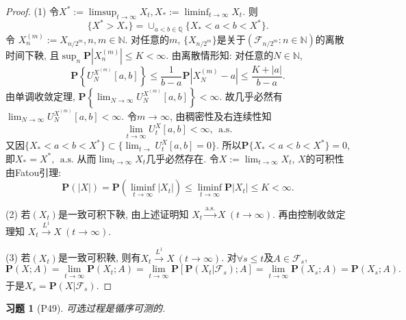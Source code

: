 \documentclass[UTF8,ondside]{ctexart}
\newtheorem{exercise}{习题}[section]
\newcommand{\h}{\mathscr}
\newcommand{\kx}{\mathbb}
\newcommand{\mbf}{\mathbf}
\numberwithin{equation}{section}
\begin{document}
	\begin{proof}
		(1) 令$X^*:=\limsup_{t\rightarrow\infty}X_t,X_*:=\liminf_{t\rightarrow\infty}X_t$. 则
		\[
			\{X^*>X_*\}=\cup_{a<b\in\kx Q}\{X_*<a<b<X^*\}.
		\]
		令 $X_n^{(m)}:=X_{n/2^m},n,m\in\kx N$. 对任意的$m$, $\{X_{n/2^m}\}$是关于$(\h F_{n/2^m}:n\in\kx N)$的离散时间下鞅, 且$\sup_{n}\mbf P |X_n^{(m)} | \leq K<\infty$. 由离散情形知: 对任意的$N\in\kx N$, 
		\[
			\mbf P\left\{U_N^{X^{(m)}}[a,b]\right\}\leq \frac{1}{b-a}\mbf P|X_N^{(m)}-a|\leq \frac{K+|a|}{b-a}.
		\]
		由单调收敛定理, $\mbf P\left\{\lim_{N\rightarrow\infty}U_N^{X^{(m)}}[a,b]\right\}<\infty$. 故几乎必然有 $\lim_{N\rightarrow\infty}U_N^{X^{(m)}}[a,b]<\infty$. 令$m\rightarrow\infty$, 由稠密性及右连续性知
		\[
			\lim_{t\rightarrow\infty}U_t^X[a,b]<\infty,\ \ \text{a.s.}
		\]
		又因$\{X_*<a<b<X^*\}\subset\{\lim_{t\rightarrow}U_t^X[a,b]=0\}$. 所以$\mbf P\{X_*<a<b<X^*\}=0$, 即$X_*=X^*,\ \ \text{a.s.}$ 从而$\lim_{t\rightarrow\infty}X_t$几乎必然存在. 令$X:=\lim_{t\rightarrow\infty}X_t$, $X$的可积性由Fatou引理:
		\[
			\mbf P(|X|)=\mbf P\left(\liminf_{t\rightarrow\infty}|X_t|\right)\leq \liminf_{t\rightarrow\infty}\mbf P|X_t|\leq K<\infty.
		\]

		(2) 若$(X_t)$是一致可积下鞅, 由上述证明知 $X_t\xrightarrow{\text{a.s.}}X\ (t\rightarrow\infty)$. 再由控制收敛定理知 $X_t\xrightarrow{L^1}X\ (t\rightarrow\infty)$.

		(3) 若$(X_t)$是一致可积鞅, 则有$X_t\xrightarrow{L^1}X\ (t\rightarrow\infty)$. 对$\forall s\leq t$及$A\in \h F_s$,
		\[
			\mbf P(X;A)=\lim_{t\rightarrow\infty}\mbf P(X_t;A)=\lim_{t\rightarrow\infty}\mbf P[\mbf P(X_t|\h F_s);A]=\lim_{t\rightarrow\infty}\mbf P(X_s;A)=\mbf P(X_s;A).
		\]
		于是$X_s=\mbf P(X|\h F_s)$.
	\end{proof}
	\begin{exercise}[P49]
		可选过程是循序可测的.
	\end{exercise}
\end{document}
